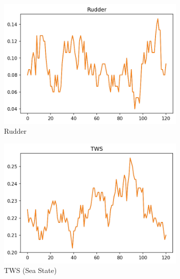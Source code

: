 \documentclass[12pt,twoside]{report}
\begin{document}
\begin{figure}[h]
     \centering
     \begin{subfigure}[b]{0.32\textwidth}
         \centering
         \includegraphics[width=\textwidth]{figures/prediction-plots/Rudder.png}
         \caption{Rudder}
     \end{subfigure}
     \begin{subfigure}[b]{0.32\textwidth}
         \centering
         \includegraphics[width=\textwidth]{figures/prediction-plots/TWS.png}
         \caption{TWS (Sea State)}
     \end{subfigure}
     \begin{subfigure}[b]{0.32\textwidth}
         \centering

\end{subfigure}
\end{figure}
\end{document}

